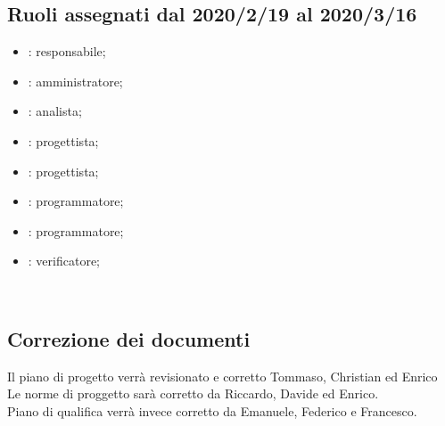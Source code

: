 \subsection{Ruoli assegnati dal 2020/2/19 al 2020/3/16}
\begin{itemize}
	\item \LD{}: responsabile; 
	\item \SE{}: amministratore;
	\item \DF{}: analista;
	\item \EC{}: progettista;
	\item \MC{}: progettista;
	\item \BR{}: programmatore;
	\item \PF{}: programmatore;
	\item \AT{}: verificatore;
\end{itemize}\\

\subsection{Correzione dei documenti}
Il piano di progetto verrà revisionato e corretto Tommaso, Christian ed Enrico\\
Le norme di proggetto sarà corretto da Riccardo, Davide ed Enrico.\\
Piano di qualifica verrà invece corretto da Emanuele, Federico e Francesco.\\

\clearpage